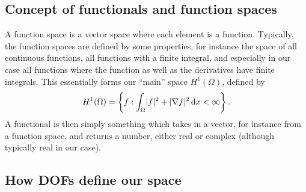 \subsection{Concept of functionals and function spaces}
A function space is a vector space where each element is a function.
Typically, the function spaces are defined by some properties, for instance the space of all continuous functions, all functions with a finite integral, and especially in our case all functions where the function as well as the derivatives have finite integrals.
This essentially forms our ``main'' space $H^1(\Omega)$, defined by
\begin{equation}
    H^1(\Omega) =
    \left\{
        f
        :
        \int_{\Omega} \lvert f\rvert^2 + \lvert\nabla f\rvert^2 \mathop{}\!\mathrm{d} x < \infty
    \right\}.
\end{equation}
A functional is then simply something which takes in a vector, for instance from a function space, and returns a number, either real or complex (although typically real in our case).

\subsection{How DOFs define our space}

